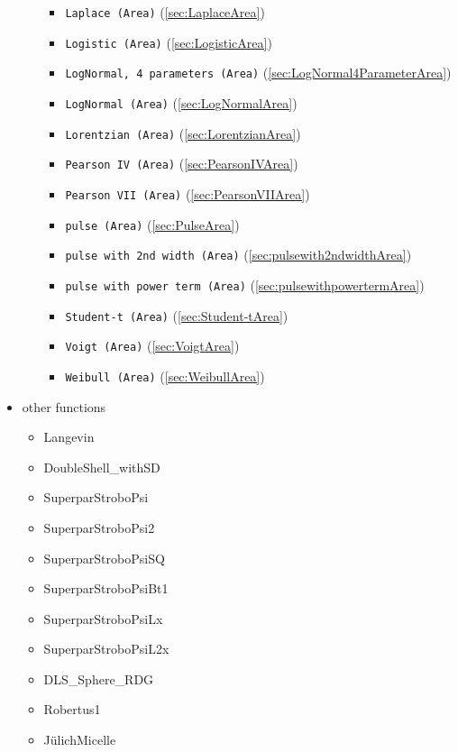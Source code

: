 \begin{itemize}
\begin{itemize}
\begin{itemize}
    \item \texttt{Laplace (Area)} (\ref{sec:LaplaceArea})
    \item \texttt{Logistic (Area)} (\ref{sec:LogisticArea})
    \item \texttt{LogNormal, 4 parameters (Area)} (\ref{sec:LogNormal4ParameterArea})
    \item \texttt{LogNormal (Area)} (\ref{sec:LogNormalArea})
    \item \texttt{Lorentzian (Area)} (\ref{sec:LorentzianArea})
    \item \texttt{Pearson IV (Area)} (\ref{sec:PearsonIVArea})
    \item \texttt{Pearson VII (Area)} (\ref{sec:PearsonVIIArea})
    \item \texttt{pulse (Area)}  (\ref{sec:PulseArea})
    \item \texttt{pulse with 2nd width (Area)}  (\ref{sec:pulsewith2ndwidthArea})
    \item \texttt{pulse with power term (Area)}  (\ref{sec:pulsewithpowertermArea})
    \item \texttt{Student-t (Area)} (\ref{sec:Student-tArea})
    \item \texttt{Voigt (Area)} (\ref{sec:VoigtArea})
    \item \texttt{Weibull (Area)} (\ref{sec:WeibullArea})
  \end{itemize}
\end{itemize}
\item other functions
\begin{itemize}
\item Langevin
\item DoubleShell\_withSD
\item SuperparStroboPsi
\item SuperparStroboPsi2
\item SuperparStroboPsiSQ
\item SuperparStroboPsiBt1
\item SuperparStroboPsiLx
\item SuperparStroboPsiL2x
\item DLS\_Sphere\_RDG
\item Robertus1
\item J\"{u}lichMicelle
\end{itemize}
\end{itemize}


\clearpage

\clearpage

\clearpage

\clearpage

\clearpage

\clearpage

\clearpage

\clearpage

\clearpage

\clearpage

\clearpage

